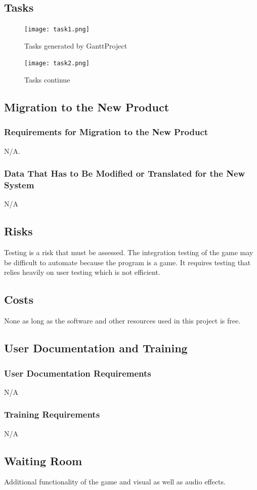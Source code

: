 \documentclass[12pt, titlepage]{article}
\begin{document}
\subsection{Tasks}
\begin{figure}[h]
\texttt{[image: task1.png]}
\caption{Tasks generated by GanttProject}
\end{figure}
\begin{figure}[h]
\texttt{[image: task2.png]}
\caption{Tasks continue}
\end{figure}

\subsection{Migration to the New Product}
\subsubsection{Requirements for Migration to the New Product}
N/A.
\subsubsection{Data That Has to Be Modified or Translated for the New System}
N/A
\subsection{Risks}
Testing is a risk that must be assessed. The integration testing of the game may be difficult to automate because the program is a game. It requires testing that relies heavily on user testing which is not efficient.
\subsection{Costs}
None as long as the software and other resources used in this project is free.
\subsection{User Documentation and Training}
\subsubsection{User Documentation Requirements}
N/A
\subsubsection{Training Requirements}
N/A

\subsection{Waiting Room}
Additional functionality of the game and visual as well as audio effects.
\end{document}
